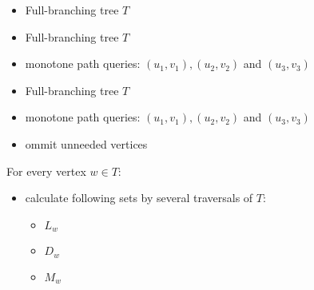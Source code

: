 \documentclass[18pt]{beamer}
\begin{document}
\begin{frame}
\begin{figure}
	\end{figure}

            \begin{overprint}
            	\begin{itemize}
            		\item {\color{blue} Full-branching} tree $T$
            	\end{itemize}
            	\begin{itemize}
            		\item {\color{blue} Full-branching} tree $T$
            		\item monotone path queries: {\color{blue} $(u_1,v_1), (u_2, v_2)$} and {\color{blue} $(u_3, v_3)$}
            	\end{itemize}
	            \begin{itemize}
	            	\item {\color{blue} Full-branching} tree $T$
	            	\item monotone path queries: {\color{blue} $(u_1,v_1), (u_2, v_2)$} and {\color{blue} $(u_3, v_3)$}
	            	\item ommit unneeded vertices
	            \end{itemize}
            	For every vertex $w \in T$: 
            	\begin{itemize}
            		\item calculate following sets by several traversals of $T$:
            			\begin{itemize}
            				\item $L_w$
            				\item $D_w$
            				\item $M_w$
            			\end{itemize}
            	

\end{itemize}
\end{overprint}
\end{frame}
\end{document}
